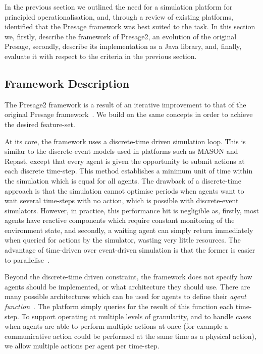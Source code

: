 In the previous section we outlined the need for a simulation platform for
principled operationalisation, and, through a review of existing platforms,
identified that the Presage framework was best suited to the task. In this
section we, firstly, describe the framework of Presage2, an evolution of the
original Presage, secondly, describe its implementation as a Java library,
and, finally, evaluate it with respect to the criteria in the previous
section.

\subsection{Framework Description}

The Presage2 framework is a result of an iterative improvement to that of the
original Presage framework~\citep{Neville:2009}. We build on the same concepts
in order to achieve the desired feature-set.

At its core, the framework uses a discrete-time driven simulation loop. This
is similar to the discrete-event models used in platforms such as MASON and
Repast, except that every agent is given the opportunity to submit actions at
each discrete time-step. This method establishes a minimum unit of time within
the simulation which is equal for all agents. The drawback of a discrete-time
approach is that the simulation cannot optimise periods when agents want to
wait several time-steps with no action, which is possible with discrete-event
simulators. However, in practice, this performance hit is negligible as,
firstly, most agents have reactive components which require constant
monitoring of the environment state, and secondly, a waiting agent can simply
return immediately when queried for actions by the simulator, wasting very
little resources. The advantage of time-driven over event-driven simulation is
that the former is easier to parallelise~\citep{Ferscha1995}.

Beyond the discrete-time driven constraint, the framework does not specify how
agents should be implemented, or what architecture they should use. There are
many possible architectures which can be used for agents to define their
\emph{agent function}~\citep{Rao1995,Kakas:2004bh}. The platform simply
queries for the result of this function each time-step. To support operating
at multiple levels of granularity, and to handle cases when agents are able to
perform multiple actions at once (for example a communicative action could be
performed at the same time as a physical action), we allow multiple actions
per agent per time-step.


